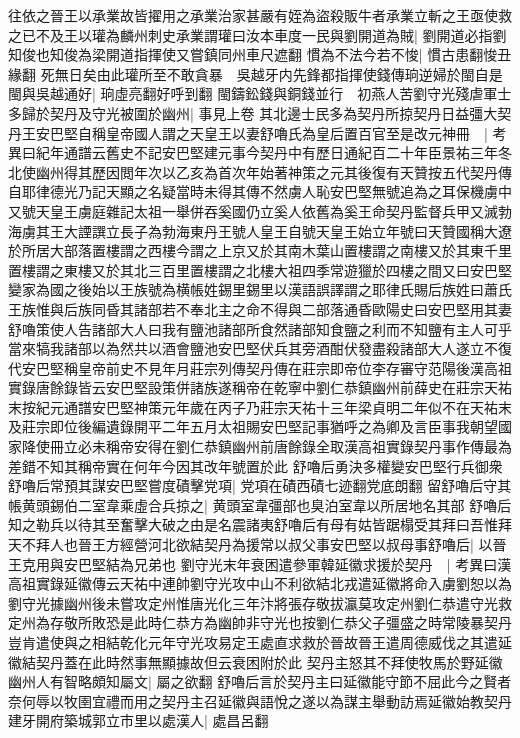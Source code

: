 往依之晉王以承業故皆擢用之承業治家甚嚴有姪為盜殺販牛者承業立斬之王亟使救之已不及王以瓘為麟州刺史承業謂瓘曰汝本車度一民與劉開道為賊|{
	劉開道必指劉知俊也知俊為梁開道指揮使又嘗鎮同州車尺遮翻}
慣為不法今若不悛|{
	慣古患翻悛丑緣翻}
死無日矣由此瓘所至不敢貪暴　吳越牙内先鋒都指揮使錢傳珦逆婦於閩自是閩與吳越通好|{
	珦虛亮翻好呼到翻}
閩鑄鈆錢與銅錢並行　初燕人苦劉守光殘虐軍士多歸於契丹及守光被圍於幽州|{
	事見上卷}
其北邊士民多為契丹所掠契丹日益彊大契丹王安巴堅自稱皇帝國人謂之天皇王以妻舒嚕氏為皇后置百官至是改元神冊　|{
	考異曰紀年通譜云舊史不記安巴堅建元事今契丹中有歷日通紀百二十年臣景祐三年冬北使幽州得其歷因閲年次以乙亥為首次年始著神策之元其後復有天贊按五代契丹傳自耶律德光乃記天顯之名疑當時未得其傳不然虜人恥安巴堅無號追為之耳保機虜中又號天皇王虜庭雜記太祖一舉併吞奚國仍立奚人依舊為奚王命契丹監督兵甲又滅勃海虜其王大諲譔立長子為勃海東丹王號人皇王自號天皇王始立年號曰天贊國稱大遼於所居大部落置樓謂之西樓今謂之上京又於其南木葉山置樓謂之南樓又於其東千里置樓謂之東樓又於其北三百里置樓謂之北樓大祖四季常遊獵於四樓之間又曰安巴堅變家為國之後始以王族號為横帳姓錫里錫里以漢語誤譯謂之耶律氏賜后族姓曰蕭氏王族惟與后族同昏其諸部若不奉北主之命不得與二部落通昏歐陽史曰安巴堅用其妻舒嚕策使人告諸部大人曰我有鹽池諸部所食然諸部知食鹽之利而不知鹽有主人可乎當來犒我諸部以為然共以酒會鹽池安巴堅伏兵其旁酒酣伏發盡殺諸部大人遂立不復代安巴堅稱皇帝前史不見年月莊宗列傳契丹傳在莊宗即帝位李存審守范陽後漢高祖實錄唐餘錄皆云安巴堅設策併諸族遂稱帝在乾寧中劉仁恭鎮幽州前薛史在莊宗天祐末按紀元通譜安巴堅神策元年歲在丙子乃莊宗天祐十三年梁貞明二年似不在天祐末及莊宗即位後編遺錄開平二年五月太祖賜安巴堅記事猶呼之為卿及言臣事我朝望國家降使冊立必未稱帝安得在劉仁恭鎮幽州前唐餘錄全取漢高祖實錄契丹事作傳最為差錯不知其稱帝實在何年今因其改年號置於此}
舒嚕后勇決多權變安巴堅行兵御衆舒嚕后常預其謀安巴堅嘗度磧擊党項|{
	党項在磧西磧七迹翻党底朗翻}
留舒嚕后守其帳黄頭錫伯二室韋乘虛合兵掠之|{
	黄頭室韋彊部也臭泊室韋以所居地名其部}
舒嚕后知之勒兵以待其至奮擊大破之由是名震諸夷舒嚕后有母有姑皆踞榻受其拜曰吾惟拜天不拜人也晉王方經營河北欲結契丹為援常以叔父事安巴堅以叔母事舒嚕后|{
	以晉王克用與安巴堅結為兄弟也}
劉守光末年衰困遣參軍韓延徽求援於契丹　|{
	考異曰漢高祖實錄延徽傳云天祐中連帥劉守光攻中山不利欲結北戎遣延徽將命入虜劉恕以為劉守光據幽州後未嘗攻定州惟唐光化三年汴將張存敬拔瀛莫攻定州劉仁恭遣守光救定州為存敬所敗恐是此時仁恭方為幽帥非守光也按劉仁恭父子彊盛之時常陵暴契丹豈肯遣使與之相結乾化元年守光攻易定王處直求救於晉故晉王遣周德威伐之其遣延徽結契丹蓋在此時然事無顯據故但云衰困附於此}
契丹主怒其不拜使牧馬於野延徽幽州人有智略頗知屬文|{
	屬之欲翻}
舒嚕后言於契丹主曰延徽能守節不屈此今之賢者奈何辱以牧圉宜禮而用之契丹主召延徽與語悅之遂以為謀主舉動訪焉延徽始教契丹建牙開府築城郭立市里以處漢人|{
	處昌呂翻}
